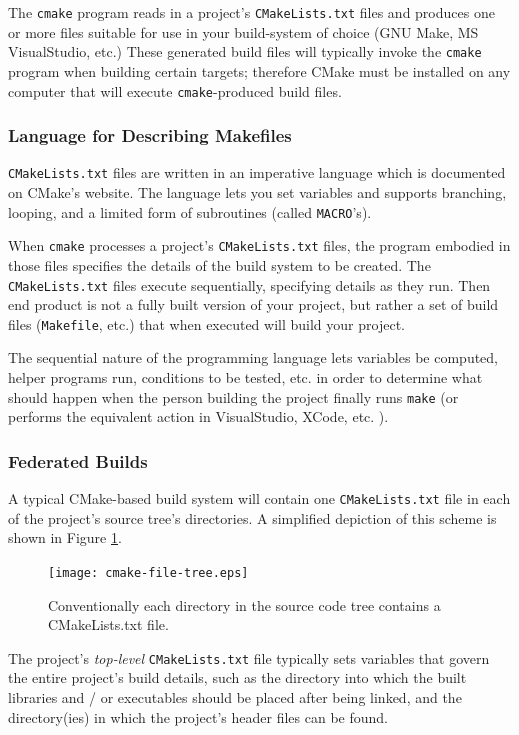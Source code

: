 \documentclass[letterpaper,10pt]{article}
\begin{document}
The \verb|cmake| program reads in a project's \verb|CMakeLists.txt| files and produces
one or more files suitable for use in your build-system of choice (GNU Make, 
MS VisualStudio, etc.)  These generated build files will typically invoke the
\verb|cmake| program when building certain targets; therefore CMake must be installed
on any computer that will execute \verb|cmake|-produced build files.

\subsubsection{Language for Describing Makefiles}
\verb|CMakeLists.txt| files are written in an imperative language which is
documented on CMake's website.  The language lets you set variables and
supports branching, looping, and a limited form of subroutines (called
\verb|MACRO|'s).

When \verb|cmake| processes a project's \verb|CMakeLists.txt| files, the program
embodied in those files specifies the details of the build system to be created.
The \verb|CMakeLists.txt| files execute sequentially, specifying details as they
run.  Then end product is not a fully built version of your project, but rather
a set of build files (\verb|Makefile|, etc.) that when executed will build your
project.

The sequential nature of the programming language lets variables be computed,
helper programs run, conditions to be tested, etc. in order to determine what should
happen when the person building the project finally runs \verb|make| (or performs the
equivalent action in VisualStudio, XCode, etc. ).

\subsubsection{Federated Builds}
A typical CMake-based build system will contain one \verb|CMakeLists.txt| file
in each of the project's source tree's directories.  A simplified depiction
of this scheme is shown in Figure \ref{fig:cmake-file-tree}.


\begin{figure}
 \centering
\texttt{[image: cmake-file-tree.eps]}
   \caption{Conventionally each directory in the source code tree contains a CMakeLists.txt file.}
   \label{fig:cmake-file-tree}
\end{figure}


The project's \textit{top-level} \verb|CMakeLists.txt| file typically sets variables that
govern the entire project's build details, such as the directory into which 
the built libraries and / or executables should be placed after being linked, and
the directory(ies) in which the project's header files can be found.
\end{document}
